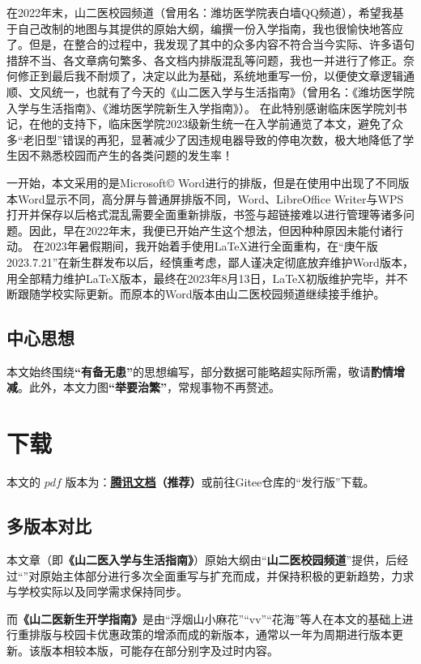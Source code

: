 在2022年末，山二医校园频道（曾用名：潍坊医学院表白墙QQ频道），希望我基于自己改制的地图与其提供的原始大纲，编撰一份入学指南，我也很愉快地答应了。但是，在整合的过程中，我发现了其中的众多内容不符合当今实际、许多语句措辞不当、各文章病句繁多、各文档内排版混乱等问题，我也一并进行了修正。奈何修正到最后我不耐烦了，决定以此为基础，系统地重写一份，以便使文章逻辑通顺、文风统一，也就有了今天的《山二医入学与生活指南》（曾用名：《潍坊医学院入学与生活指南》、《潍坊医学院新生入学指南》）。
在此特别感谢临床医学院刘书记，在他的支持下，临床医学院2023级新生统一在入学前通览了本文，避免了众多“老旧型”错误的再犯，显著减少了因违规电器导致的停电次数，极大地降低了学生因不熟悉校园而产生的各类问题的发生率！

一开始，本文采用的是Microsoft© Word进行的排版，但是在使用中出现了不同版本Word显示不同，高分屏与普通屏排版不同，Word、LibreOffice Writer与WPS打开并保存以后格式混乱需要全面重新排版，书签与超链接难以进行管理等诸多问题。因此，早在2022年末，我便已开始产生这个想法，但因种种原因未能付诸行动。
在2023年暑假期间，我开始着手使用\LaTeX 进行全面重构，在“庚午版 2023.7.21”在新生群发布以后，经慎重考虑，鄙人谨决定彻底放弃维护Word版本，用全部精力维护\LaTeX 版本，最终在2023年8月13日，\LaTeX 初版维护完毕，并不断跟随学校实际更新。而原本的Word版本由山二医校园频道继续接手维护。

\subsection[中心思想]{中心思想}
本文始终围绕\textbf{“有备无患”}的思想编写，部分数据可能略超实际所需，敬请\textbf{酌情增减}。此外，本文力图\textbf{“举要治繁”}，常规事物不再赘述。

\section[下载]{下载}
本文的 $pdf$ 版本\textbf{}为：\textbf{\uline{\href{https://docs.qq.com/s/ETcQ-ZFSrSsh6MK9bm773q}{腾讯文档}}（推荐）}或前往Gitee仓库的“发行版”下载。


\subsection[多版本对比]{多版本对比}
本文章（即\textbf{《山二医入学与生活指南》}）原始大纲由“\textbf{山二医校园频道}”提供，后经过“\textbf{}”对原始主体部分进行多次全面重写与扩充而成，并保持积极的更新趋势，力求与学校实际以及同学需求保持同步。

而\textbf{《山二医新生开学指南》}是由“浮烟山小麻花”“vv”“花海”等人在本文的基础上进行重排版与校园卡优惠政策的增添而成的新版本，通常以一年为周期进行版本更新。该版本相较本版，可能存在部分别字及过时内容。

